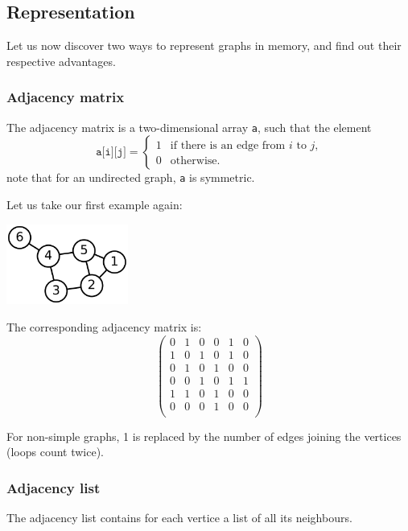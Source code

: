 \subsection{Representation}

Let us now discover two ways to represent graphs in memory,
and find out their respective advantages.

\subsubsection{Adjacency matrix}

The adjacency matrix is a two-dimensional array \texttt{a},
such that the element
\[
	\texttt{a[i][j]} =
	\begin{cases}
		1 & \text{if there is an edge from $i$ to $j$,}\\
		0 & \text{otherwise}.
	\end{cases}
\]
note that for an undirected graph, \texttt{a} is symmetric.

Let us take our first example again:

\begin{center}
	\includegraphics[width=0.3\textwidth]{img/6n-graph}
\end{center}

The corresponding adjacency matrix is:
\[
	\begin{pmatrix}
		0&1&0&0&1&0\\
		1&0&1&0&1&0\\
		0&1&0&1&0&0\\
		0&0&1&0&1&1\\
		1&1&0&1&0&0\\
		0&0&0&1&0&0\\
	\end{pmatrix}
\]

For non-simple graphs, 1 is replaced by the number of edges
joining the vertices (loops count twice).

\subsubsection{Adjacency list}

The adjacency list contains for each vertice a list
of all its neighbours.

